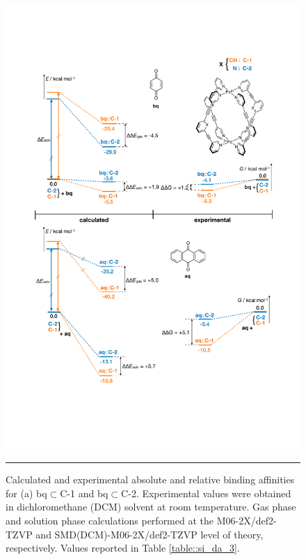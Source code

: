 \documentclass[../../main.tex]{subfiles}
\begin{document}
\begin{figure}[h!]
	\vspace{0.4cm}
	\centering
	\includegraphics[width=13.5cm]{3/da/figs/fig3/fig3.pdf}
	\vspace{0.2cm}
	\hrule
	\caption{Calculated and experimental absolute and relative binding affinities for (a) bq$\subset$C-1 and bq$\subset$C-2. Experimental values were obtained in dichloromethane (DCM) solvent at room temperature. Gas phase and solution phase calculations performed at the M06-2X/def2-TZVP and SMD(DCM)-M06-2X/def2-TZVP level of theory, respectively. Values reported in Table \ref{table::si_da_3}.}
	\label{fig::da_3}
\end{figure}
\end{document}
